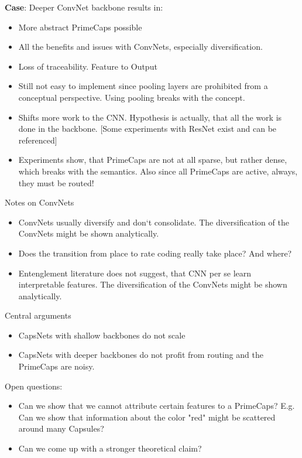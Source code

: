 \documentclass{article}
\begin{document}
\textbf{Case}: Deeper ConvNet backbone results in:
\begin{itemize}
	\item More abstract PrimeCaps possible
	\item All the benefits and issues with ConvNets, especially diversification.
	\item Loss of traceability. Feature to Output
	\item Still not easy to implement since pooling layers are prohibited from a conceptual perspective. Using pooling breaks with the concept.
	\item Shifts more work to the CNN. Hypothesis is actually, that all the work is done in the backbone. [Some experiments with ResNet exist and can be referenced]
	\item Experiments show, that PrimeCaps are not at all sparse, but rather dense, which breaks with the semantics. Also since all PrimeCaps are active, always, they must be routed!
\end{itemize}

Notes on ConvNets
\begin{itemize}
	\item ConvNets usually diversify and don`t consolidate. The diversification of the ConvNets might be shown analytically.
	\item Does the transition from place to rate coding really take place? And where?
	\item Entenglement literature does not suggest, that CNN per se learn interpretable features.
	The diversification of the ConvNets might be shown analytically.
\end{itemize}

Central arguments
\begin{itemize}
	\item CapsNets with shallow backbones do not scale
	\item CapsNets with deeper backbones do not profit from routing and the PrimeCaps are noisy. 
\end{itemize}

Open questions:
\begin{itemize}
	\item Can we show that we cannot attribute certain features to a PrimeCaps? E.g. Can we show that information about the color "red" might be scattered around many Capsules?
	\item Can we come up with a stronger theoretical claim?
\end{itemize}
\end{document}
